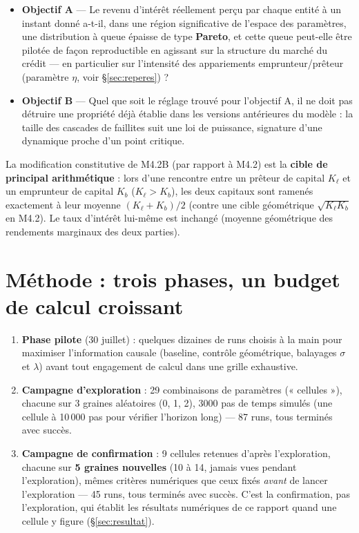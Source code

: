 \documentclass[11pt,a4paper]{article}
\begin{document}
\begin{itemize}
\item \textbf{Objectif A} --- Le revenu d'intérêt réellement perçu par
  chaque entité à un instant donné a-t-il, dans une région significative
  de l'espace des paramètres, une distribution à queue épaisse de type
  \textbf{Pareto}, et cette queue peut-elle être pilotée de façon
  reproductible en agissant sur la structure du marché du crédit --- en
  particulier sur l'intensité des appariements emprunteur/prêteur
  (paramètre $\eta$, voir \S\ref{sec:reperes}) ?
\item \textbf{Objectif B} --- Quel que soit le réglage trouvé pour
  l'objectif A, il ne doit pas détruire une propriété déjà établie dans
  les versions antérieures du modèle : la taille des cascades de
  faillites suit une loi de puissance, signature d'une dynamique proche
  d'un point critique.
\end{itemize}

La modification constitutive de M4.2B (par rapport à M4.2) est la
\textbf{cible de principal arithmétique} : lors d'une rencontre entre un
prêteur de capital $K_\ell$ et un emprunteur de capital $K_b$
($K_\ell>K_b$), les deux capitaux sont ramenés exactement à leur moyenne
$(K_\ell+K_b)/2$ (contre une cible géométrique $\sqrt{K_\ell K_b}$ en
M4.2). Le taux d'intérêt lui-même est inchangé (moyenne géométrique des
rendements marginaux des deux parties).

\section{Méthode : trois phases, un budget de calcul croissant}

\begin{enumerate}
\item \textbf{Phase pilote} (30 juillet) : quelques dizaines de runs
  choisis à la main pour maximiser l'information causale (baseline,
  contrôle géométrique, balayages $\sigma$ et $\lambda$) avant tout
  engagement de calcul dans une grille exhaustive.
\item \textbf{Campagne d'exploration} : 29 combinaisons de paramètres
  (« cellules »), chacune sur 3 graines aléatoires (0, 1, 2), 3000 pas
  de temps simulés (une cellule à 10\,000 pas pour vérifier l'horizon
  long) --- 87 runs, tous terminés avec succès.
\item \textbf{Campagne de confirmation} : 9 cellules retenues d'après
  l'exploration, chacune sur \textbf{5 graines nouvelles} (10 à 14,
  jamais vues pendant l'exploration), mêmes critères numériques que ceux
  fixés \emph{avant} de lancer l'exploration --- 45 runs, tous terminés
  avec succès. C'est la confirmation, pas l'exploration, qui établit les
  résultats numériques de ce rapport quand une cellule y figure
  (\S\ref{sec:resultat}).
\end{enumerate}
\end{document}

